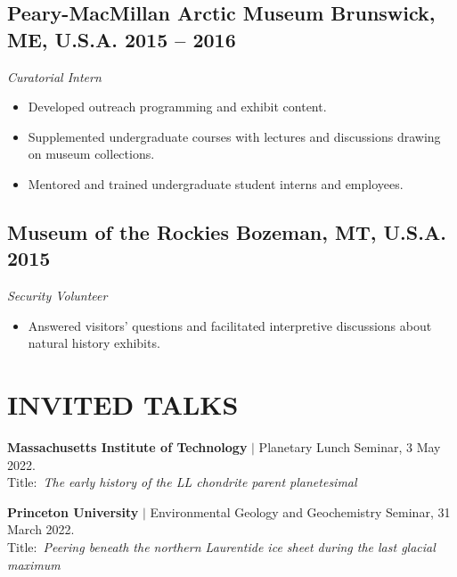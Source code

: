 \documentclass[10pt]{article}
\begin{document}
\subsection*{\textbf{Peary-MacMillan Arctic Museum} \hspace{15pt} Brunswick, ME, U.S.A. \hfill 2015 – 2016}
\textit{Curatorial Intern}
\begin{itemize}
	\item Developed outreach programming and exhibit content.
	\item Supplemented undergraduate courses with lectures and discussions drawing on museum collections.
	\item Mentored and trained undergraduate student interns and employees.
\end{itemize}

\subsection*{\textbf{Museum of the Rockies} \hspace{15pt} Bozeman, MT, U.S.A. \hfill 2015}
\textit{Security Volunteer}
\begin{itemize}
	\item Answered visitors' questions and facilitated interpretive discussions about natural history exhibits.
\end{itemize}


\section*{INVITED TALKS}

\begin{etaremune} [itemsep=4pt, leftmargin=3ex]

   \item \textbf{Massachusetts Institute of Technology} $|$
   Planetary Lunch Seminar, 3 May 2022. \\
  Title:~\textit{The early history of the LL chondrite parent planetesimal}

  \item \textbf{Princeton University} $|$ 
  Environmental Geology and Geochemistry Seminar, 31 March 2022. \\
  Title:~\textit{Peering beneath the northern Laurentide ice sheet during the last glacial maximum}
  
\end{etaremune}
\vspace{-12pt}
\end{document}
